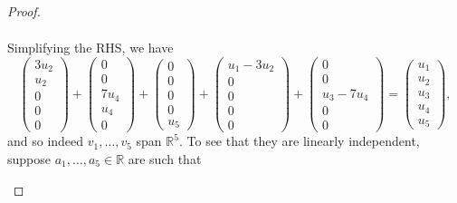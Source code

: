 \documentclass{extarticle}
\newcommand{\R}{\mathbb{R}}
\begin{document}
\begin{proof}
\begin{enumerate}[(a)]
\begin{multline*}
\end{multline*}
Simplifying the RHS, we have
\begin{equation*}
\begin{pmatrix} 3u_2 \\ u_2 \\ 0 \\ 0\\ 0 \end{pmatrix} + \begin{pmatrix} 0 \\ 0 \\ 7u_4 \\ u_4 \\ 0 \end{pmatrix} + \begin{pmatrix} 0 \\ 0 \\ 0 \\ 0 \\ u_5 \end{pmatrix} + \begin{pmatrix} u_1 -3u_2\\ 0 \\ 0 \\ 0 \\ 0 \end{pmatrix} + \begin{pmatrix} 0 \\ 0 \\ u_3 - 7u_4 \\ 0 \\ 0 \end{pmatrix} = 
\begin{pmatrix} u_1 \\ u_2 \\ u_3 \\ u_4\\ u_5 \end{pmatrix},
\end{equation*}
and so indeed $v_1,\dots, v_5$ span $\R^5$.  To see that they are linearly independent, suppose $a_1,\dots,a_5\in\R$ are such that 
\begin{equation*}

\end{equation*}
\end{enumerate}
\end{proof}
\end{document}
